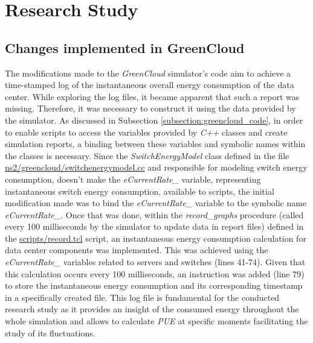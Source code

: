 \chapter{Research Study} \label{chapter:research_study}

\begin{citazione}

\end{citazione}
\newpage

\section{Changes implemented in GreenCloud}\label{section:greencloud_mod}
The modifications made to the \emph{GreenCloud} simulator's code aim to achieve a time-stamped log of the instantaneous overall energy consumption of the data center. While exploring the log files, it became apparent that such a report was missing. Therefore, it was necessary to construct it using the data provided by the simulator. As discussed in Subsection \ref{subsection:greencloud_code}, in order to enable scripts to access the variables provided by \emph{C++} classes and create simulation reports, a binding between these variables and symbolic names within the classes is necessary. Since the \emph{SwitchEnergyModel} class defined in the file \href{https://github.com/vincenzo-emanuele/masters-degree-thesis/blob/main/greencloud_modified_src/ns2/greencloud/switchenergymodel.cc}{ns2/greencloud/switchenergymodel.cc} and responsible for modeling switch energy consumption, doesn't make the \emph{eCurrentRate\_} variable, representing instantaneous switch energy consumption, available to scripts, the initial modification made was to bind the \emph{eCurrentRate\_} variable to the symbolic name \emph{eCurrentRate\_}. Once that was done, within the \emph{record\_graphs} procedure (called every 100 milliseconds by the simulator to update data in report files) defined in the \href{https://github.com/vincenzo-emanuele/masters-degree-thesis/blob/main/greencloud\_modified\_src/scripts/record.tcl}{scripts/record.tcl} script, an instantaneous energy consumption calculation for data center components was implemented. This was achieved using the \emph{eCurrentRate\_} variables related to servers and switches (lines 41-74). Given that this calculation occurs every 100 milliseconds, an instruction was added (line 79) to store the instantaneous energy consumption and its corresponding timestamp in a specifically created file. This log file is fundamental for the conducted research study as it provides an insight of the consumed energy throughout the whole simulation and allows to calculate \emph{PUE} at specific moments facilitating the study of its fluctuations.

